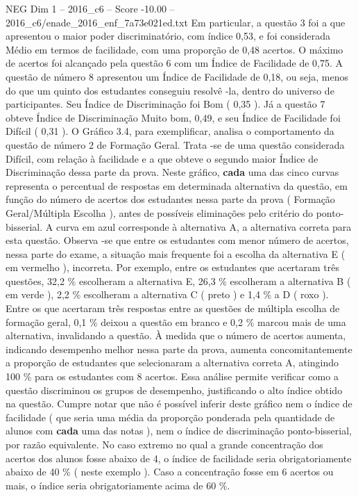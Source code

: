 \begin{textsample}{NEG Dim 1 – 2016\_c6 – Score -10.00 – 2016\_c6/enade\_2016\_enf\_7a73e021ed.txt}
Em particular, a questão 3 foi a que apresentou o maior poder discriminatório, com índice 0,53, e foi considerada Médio em termos de facilidade, com uma proporção de 0,48 acertos.
O máximo de acertos foi alcançado pela questão 6 com um Índice de Facilidade de 0,75.
A questão de número 8 apresentou um Índice de Facilidade de 0,18, ou seja, menos do que um quinto dos estudantes conseguiu resolvê -la, dentro do universo de participantes.
Seu Índice de Discriminação foi Bom ( 0,35 ).
Já a questão 7 obteve Índice de Discriminação Muito bom, 0,49, e seu Índice de Facilidade foi Difícil ( 0,31 ).
O Gráfico 3.4, para exemplificar, analisa o comportamento da questão de número 2 de Formação Geral.
Trata -se de uma questão considerada Difícil, com relação à facilidade e a que obteve o segundo maior Índice de Discriminação dessa parte da prova.
Neste gráfico, \textbf{cada} uma das cinco curvas representa o percentual de respostas em determinada alternativa da questão, em função do número de acertos dos estudantes nessa parte da prova ( Formação Geral/Múltipla Escolha ), antes de possíveis eliminações pelo critério do ponto-bisserial.
A curva em azul corresponde à alternativa A, a alternativa correta para esta questão.
Observa -se que entre os estudantes com menor número de acertos, nessa parte do exame, a situação mais frequente foi a escolha da alternativa E ( em vermelho ), incorreta.
Por exemplo, entre os estudantes que acertaram três questões, 32,2 \% escolheram a alternativa E, 26,3 \% escolheram a alternativa B ( em verde ), 2,2 \% escolheram a alternativa C ( preto ) e 1,4 \% a D ( roxo ).
Entre os que acertaram três respostas entre as questões de múltipla escolha de formação geral, 0,1 \% deixou a questão em branco e 0,2 \% marcou mais de uma alternativa, invalidando a questão.
À medida que o número de acertos aumenta, indicando desempenho melhor nessa parte da prova, aumenta concomitantemente a proporção de estudantes que selecionaram a alternativa correta A, atingindo 100 \% para os estudantes com 8 acertos.
Essa análise permite verificar como a questão discriminou os grupos de desempenho, justificando o alto índice obtido na questão.
Cumpre notar que não é possível inferir deste gráfico nem o índice de facilidade ( que seria uma média da proporção ponderada pela quantidade de alunos com \textbf{cada} uma das notas ), nem o índice de discriminação ponto-bisserial, por razão equivalente.
No caso extremo no qual a grande concentração dos acertos dos alunos fosse abaixo de 4, o índice de facilidade seria obrigatoriamente abaixo de 40 \% ( neste exemplo ).
Caso a concentração fosse em 6 acertos ou mais, o índice seria obrigatoriamente acima de 60 \%.

\end{textsample}
